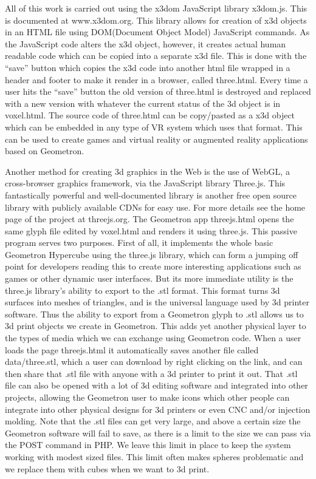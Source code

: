 All of this work is carried out using the x3dom JavaScript library x3dom.js.  This is documented at www.x3dom.org.  This library allows for creation of x3d objects in an HTML file using DOM(Document Object Model) JavaScript commands.  As the JavaScript code alters the x3d object, however, it creates actual human readable code which can be copied into a separate x3d file.  This is done with the ``save'' button which copies the x3d code into another html file wrapped in a header and footer to make it render in a browser, called three.html.  Every time a user hits the ``save'' button the old version of three.html is destroyed and replaced with a new version with whatever the current status of the 3d object is in voxel.html.  The source code of three.html can be copy/pasted as a x3d object which can be embedded in any type of VR system which uses that format.  This can be used to create games and virtual reality or augmented reality applications based on Geometron.

Another method for creating 3d graphics in the Web is the use of WebGL, a cross-browser graphics framework, via the JavaScript library Three.js.  This fantastically powerful and well-documented library is another free open source library with publicly available CDNs for easy use. For more details see the home page of the project at threejs.org.  The Geometron app threejs.html opens the same glyph file edited by voxel.html and renders it using three.js.  This passive program serves two purposes. First of all, it implements the whole basic Geometron Hypercube using the three.js library, which can form a jumping off point for developers reading this to create more interesting applications such as games or other dynamic user interfaces.  But its more immediate utility is the three.js library's ability to export to the .stl format.  This format turns 3d surfaces into meshes of triangles, and is the universal language used by 3d printer software.  Thus the ability to export from a Geometron glyph to .stl allows us to 3d print objects we create in Geometron.  This adds yet another physical layer to the types of media which we can exchange using Geometron code.  When a user loads the page threejs.html it automatically saves another file called data/three.stl, which a user can download by right clicking on the link, and can then share that .stl file with anyone with a 3d printer to print it out.  That .stl file can also be opened with a lot of 3d editing software and integrated into other projects, allowing the Geometron user to make icons which other people can integrate into other physical designs for 3d printers or even CNC and/or injection molding.  Note that the .stl files can get very large, and above a certain size the Geometron software will fail to save, as there is a limit to the size we can pass via the POST command in PHP.  We leave this limit in place to keep the system working with modest sized files.  This limit often makes spheres problematic and we replace them with cubes when we want to 3d print.

